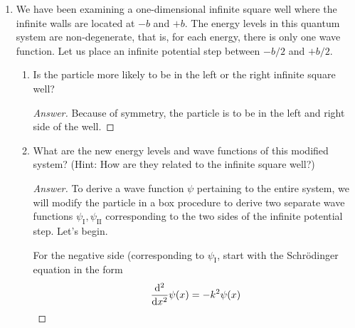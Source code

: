 \documentclass[../psets.tex]{subfiles}
\begin{document}
\begin{enumerate}
\begin{proof}[Answer]
        \begin{align*}
            \psi_1(x) &= \frac{1}{\sqrt{b}}\cos\left( \frac{\pi x}{2b} \right)&
            \psi_2(x) &= \frac{1}{\sqrt{b}}\sin\left( \frac{\pi x}{b} \right)
        \end{align*}
        Thus, the time-dependent forms are
        \begin{align*}
            \psi_1(x,t) &= \frac{1}{\sqrt{b}}\cos\left( \frac{\pi x}{2b} \right)\cdot\e[-iE_1t/\hbar]&
                \psi_2(x,t) &= \frac{1}{\sqrt{b}}\sin\left( \frac{\pi x}{b} \right)\cdot\e[-iE_2t/\hbar]\\
            \Aboxed{\psi_1(x,t) &= \frac{1}{\sqrt{b}}\cos\left( \frac{\pi x}{2b} \right)\cdot\e[-i\hbar\pi^2t/8mb^2]}&
                \Aboxed{\psi_2(x,t) &= \frac{1}{\sqrt{b}}\sin\left( \frac{\pi x}{b} \right)\cdot\e[-i\hbar\pi^2t/2mb^2]}
        \end{align*}
    \end{proof}
    \item We have been examining a one-dimensional infinite square well where the infinite walls are located at $-b$ and $+b$. The energy levels in this quantum system are non-degenerate, that is, for each energy, there is only one wave function. Let us place an infinite potential step between $-b/2$ and $+b/2$.
    \begin{enumerate}
        \item Is the particle more likely to be in the left or the right infinite square well?
        \begin{proof}[Answer]
            Because of symmetry, the particle is  to be in the left and right side of the well.
        \end{proof}
        \item What are the new energy levels and wave functions of this modified system? (Hint: How are they related to the infinite square well?)
        \begin{proof}[Answer]
            To derive a wave function $\psi$ pertaining to the entire system, we will modify the particle in a box procedure to derive two separate wave functions $\psi_\text{I},\psi_\text{II}$ corresponding to the two sides of the infinite potential step. Let's begin.\par
            For the negative side (corresponding to $\psi_\text{I}$, start with the Schr\"{o}dinger equation in the form
            \begin{equation*}
                \dv[2]{x}\psi(x) = -k^2\psi(x)

\end{equation*}
\end{proof}
\end{enumerate}
\end{enumerate}
\end{document}
